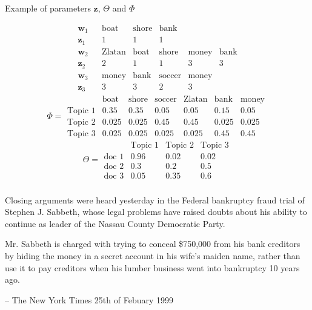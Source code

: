 \documentclass[10pt]{beamer}
\begin{document}
\begin{frame}{Example of parameters  $\mathbf{z}$, $\Theta$ and $\Phi$}

\[
\begin{array}{ccccccc}
\mathbf{w}_{1} &  & \mbox{boat} & \mbox{shore} & \mbox{bank}\\
\mathbf{z}_{1} &  & 1 & 1 & 1\\
\mathbf{w}_{2} &  & \mbox{Zlatan} & \mbox{boat} & \mbox{shore} & \mbox{money} & \mbox{bank}\\
\mathbf{z}_{2} &  & 2 & 1 & 1 & 3 & 3\\
\mathbf{w}_{3} &  & \mbox{money} & \mbox{bank} & \mbox{soccer} & \mbox{money}\\
\mathbf{z}_{3} &  & 3 & 3 & 2 & 3
\end{array}
\]
\pause
\[
\Phi=\begin{array}{ccccccc}
 & \mbox{boat} & \mbox{shore} & \mbox{soccer} & \mbox{Zlatan} & \mbox{bank} & \mbox{money}\\
\text{Topic 1} & 0.35 & 0.35 & 0.05 & 0.05 & 0.15 & 0.05\\
\text{Topic 2} & 0.025 & 0.025 & 0.45 & 0.45 & 0.025 & 0.025\\
\text{Topic 3} & 0.025 & 0.025 & 0.025 & 0.025 & 0.45 & 0.45
\end{array}
\]
\pause
\[
\Theta=\begin{array}{cccc}
 & \text{Topic 1} & \text{Topic 2} & \text{Topic 3}\\
\text{doc 1} & 0.96 & 0.02 & 0.02\\
\text{doc 2} & 0.3 & 0.2 & 0.5\\
\text{doc 3} & 0.05 & 0.35 & 0.6
\end{array}
\]


\end{frame}






\begin{frame}
\frametitle{}

Closing arguments were heard yesterday in the Federal bankruptcy fraud trial of Stephen J. Sabbeth, whose legal problems have raised doubts about his ability to continue as leader of the Nassau County Democratic Party.

\medskip

Mr. Sabbeth is charged with trying to conceal \$750,000 from his bank creditors by hiding the money in a secret account in his wife's maiden name, rather than use it to pay creditors when his lumber business went into bankruptcy 10 years ago.


\hspace{10mm} -- The New York Times 25th of Febuary 1999

\end{frame}
\end{document}
